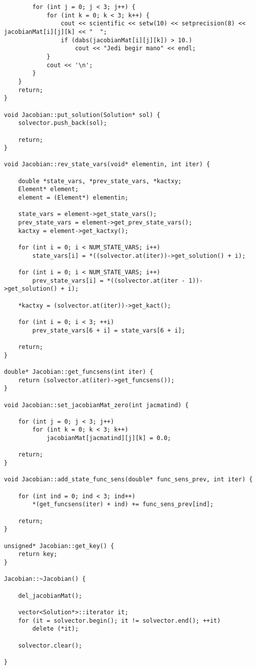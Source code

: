\documentclass[a4paper,10pt]{article}
\begin{document}
\begin{lstlisting}
		for (int j = 0; j < 3; j++) {
			for (int k = 0; k < 3; k++) {
				cout << scientific << setw(10) << setprecision(8) << jacobianMat[i][j][k] << "  ";
				if (dabs(jacobianMat[i][j][k]) > 10.)
					cout << "Jedi begir mano" << endl;
			}
			cout << '\n';
		}
	}
	return;
}

void Jacobian::put_solution(Solution* sol) {
	solvector.push_back(sol);

	return;
}

void Jacobian::rev_state_vars(void* elementin, int iter) {

	double *state_vars, *prev_state_vars, *kactxy;
	Element* element;
	element = (Element*) elementin;

	state_vars = element->get_state_vars();
	prev_state_vars = element->get_prev_state_vars();
	kactxy = element->get_kactxy();

	for (int i = 0; i < NUM_STATE_VARS; i++)
		state_vars[i] = *((solvector.at(iter))->get_solution() + i);

	for (int i = 0; i < NUM_STATE_VARS; i++)
		prev_state_vars[i] = *((solvector.at(iter - 1))->get_solution() + i);

	*kactxy = (solvector.at(iter))->get_kact();

	for (int i = 0; i < 3; ++i)
		prev_state_vars[6 + i] = state_vars[6 + i];

	return;
}

double* Jacobian::get_funcsens(int iter) {
	return (solvector.at(iter)->get_funcsens());
}

void Jacobian::set_jacobianMat_zero(int jacmatind) {

	for (int j = 0; j < 3; j++)
		for (int k = 0; k < 3; k++)
			jacobianMat[jacmatind][j][k] = 0.0;

	return;
}

void Jacobian::add_state_func_sens(double* func_sens_prev, int iter) {

	for (int ind = 0; ind < 3; ind++)
		*(get_funcsens(iter) + ind) += func_sens_prev[ind];

	return;
}

unsigned* Jacobian::get_key() {
	return key;
}

Jacobian::~Jacobian() {

	del_jacobianMat();

	vector<Solution*>::iterator it;
	for (it = solvector.begin(); it != solvector.end(); ++it)
		delete (*it);

	solvector.clear();

}

\end{lstlisting}
\end{document}
